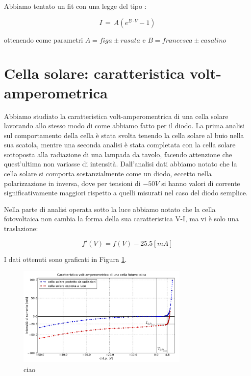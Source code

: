 Abbiamo tentato un fit con una legge del tipo : 

\begin{equation}
I \, = \, A \left( e^{B \cdot V} -1 \right)
\label{eq:diodefit}
\end{equation}

ottenendo come parametri $A= figa \pm rasata$ e $B= francesca \pm casalino$

\section{Cella solare: caratteristica volt-amperometrica}

Abbiamo studiato la caratteristica volt-amperomentrica di una cella solare lavorando allo stesso modo di come abbiamo fatto per il diodo. 
La prima analisi sul comportamento della cella è stata svolta tenendo la cella solare al buio nella sua scatola, mentre una seconda analisi è stata completata con la cella solare sottoposta alla radiazione di una lampada da tavolo, facendo attenzione che quest'ultima non variasse di intensità.
Dall'analisi dati abbiamo notato che la cella solare si comporta sostanzialmente come un diodo, eccetto nella polarizzazione in inversa, dove per tensioni di $-50V$ si hanno valori di corrente significativamente maggiori rispetto a quelli misurati nel caso del diodo semplice. 

Nella parte di analisi operata sotto la luce abbiamo notato che la cella fotovoltaica non cambia la forma della sua caratteristica V-I, ma vi è solo una traslazione: 

$$f'(V)=f(V)-25.5 [mA]$$ %
 

I dati ottenuti sono graficati in Figura \ref{fig:cella}.

\begin{figure}[h]
\center
	\includegraphics[width=0.75\textwidth]{cella.pdf}
	\caption{ciao}
	\label{fig:cella}
\end{figure}


